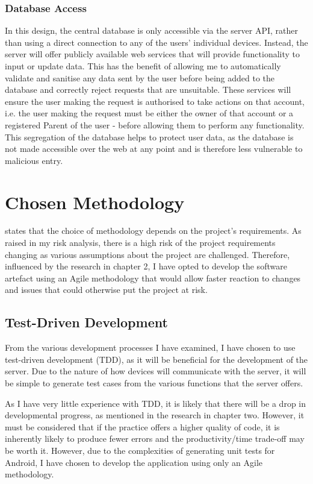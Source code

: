 \subsubsection{Database Access}
In this design, the central database is only accessible via the server API, rather than using a direct connection to any of the users' individual devices.
Instead, the server will offer publicly available web services that will provide functionality to input or update data. 
This has the benefit of allowing me to automatically validate and sanitise any data sent by the user before being added to the database and correctly reject requests that are unsuitable.
These services will ensure the user making the request is authorised to take actions on that account, i.e. the user making the request must be either the owner of that account or a registered Parent of the user - before allowing them to perform any functionality.
This segregation of the database helps to protect user data, as the database is not made accessible over the web at any point and is therefore less vulnerable to malicious entry.

\section{Chosen Methodology}
\cite{balaji2012waterfall} states that the choice of methodology depends on the project's requirements.
As raised in my risk analysis, there is a high risk of the project requirements changing as various assumptions about the project are challenged.
Therefore, influenced by the research in chapter 2, I have opted to develop the software artefact using an Agile methodology that would allow faster reaction to changes and issues that could otherwise put the project at risk.

\subsection{Test-Driven Development}
From the various development processes I have examined, I have chosen to use test-driven development (TDD), as it will be beneficial for the development of the server.
Due to the nature of how devices will communicate with the server, it will be simple to generate test cases from the various functions that the server offers.

As I have very little experience with TDD, it is likely that there will be a drop in developmental progress, as mentioned in the research in chapter two.
However, it must be considered that if the practice offers a higher quality of code, it is inherently likely to produce fewer errors and the productivity/time trade-off may be worth it.
However, due to the complexities of generating unit tests for Android, I have chosen to develop the application using only an Agile methodology.

